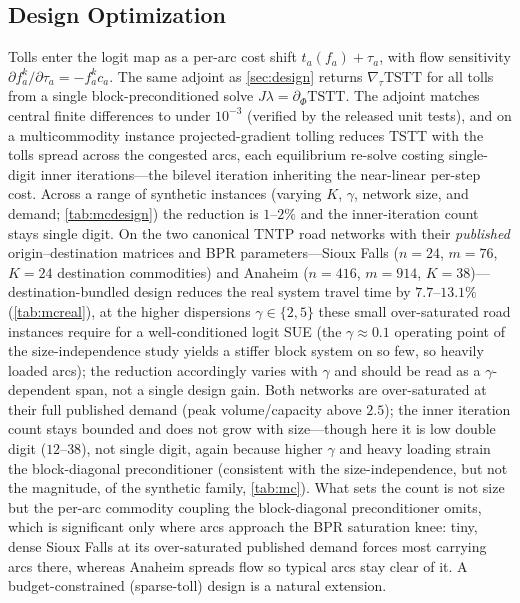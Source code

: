 \documentclass[ijoc]{informs3}
\begin{document}
\subsection{Design Optimization}
Tolls enter the logit map as a per-arc cost shift $t_a(f_a)+\tau_a$, with flow sensitivity
$\partial f^k_a/\partial\tau_a=-f^k_a c_a$. The same adjoint as \cref{sec:design} returns $\nabla_\tau\mathrm{TSTT}$
for all tolls from a single block-preconditioned solve $J\lambda=\partial_\Phi\mathrm{TSTT}$. The adjoint matches
central finite differences to under $10^{-3}$ (verified by the released unit tests), and on a multicommodity
instance projected-gradient tolling reduces TSTT with the tolls spread across the congested arcs, each
equilibrium re-solve costing single-digit inner iterations---the bilevel iteration inheriting the near-linear
per-step cost. Across a range of synthetic instances (varying $K$, $\gamma$,
network size, and demand; \cref{tab:mcdesign}) the reduction is $1$--$2\%$ and the inner-iteration count stays
single digit. On the two canonical TNTP road networks with their \emph{published} origin--destination matrices
and BPR parameters---Sioux Falls ($n=24$, $m=76$, $K=24$ destination commodities) and Anaheim ($n=416$, $m=914$,
$K=38$)---destination-bundled design reduces the real system travel time by $7.7$--$13.1\%$ (\cref{tab:mcreal}),
at the higher dispersions $\gamma\in\{2,5\}$ these small over-saturated road instances require for a
well-conditioned logit SUE (the $\gamma\approx0.1$ operating point of the size-independence study yields a
stiffer block system on so few, so heavily loaded arcs); the reduction accordingly varies with $\gamma$ and
should be read as a $\gamma$-dependent span, not a single design gain. Both
networks are over-saturated at their full published demand (peak volume/capacity above $2.5$); the inner
iteration count stays bounded and does not grow with size---though here it is low double digit ($12$--$38$),
not single digit, again because higher $\gamma$ and heavy loading strain the block-diagonal preconditioner
(consistent with the size-independence, but not the magnitude, of the synthetic family, \cref{tab:mc}). What
sets the count is not size but the per-arc commodity coupling
the block-diagonal preconditioner omits, which is significant only where arcs approach the BPR saturation knee:
tiny, dense Sioux Falls at its over-saturated published demand forces most carrying arcs there, whereas Anaheim
spreads flow so typical arcs stay clear of it. A budget-constrained (sparse-toll) design is a natural extension.
\end{document}
